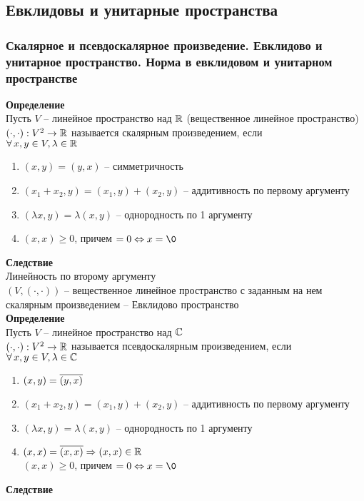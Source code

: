 \documentclass[12pt]{article}
\begin{document}
\subsection{Евклидовы и унитарные пространства}
\subsubsection{Скалярное и псевдоскалярное произведение. Евклидово и унитарное пространство. Норма в евклидовом и унитарном пространстве}
\textbf{Определение}\\
Пусть $V$ -- линейное пространство над $\mathbb{R}$ (вещественное линейное пространство)\\
$(\cdot,\cdot): V^2 \rightarrow \mathbb{R}$ называется скалярным произведением, если\\
$\forall\, x,y \in V, \lambda \in \mathbb{R}$
\begin{enumerate}
    \item $(x, y) = (y,x)$ -- симметричность
    \item $(x_1 + x_2, y) = (x_1, y) + (x_2, y)$ -- аддитивность по первому аргументу
    \item $(\lambda x, y) = \lambda(x,y)$ -- однородность по 1 аргументу
    \item $(x, x) \geq 0$, причем $=0 \LRto x=\0$
\end{enumerate}
\textbf{Следствие}\\
Линейность по второму аргументу\\
$(V, (\cdot, \cdot))$ -- вещественное линейное пространство с заданным на нем скалярным произведением -- Евклидово пространство\\
\textbf{Определение}\\
Пусть $V$ -- линейное пространство над $\mathbb{C}$\\
$(\cdot,\cdot): V^2 \rightarrow \mathbb{R}$ называется псевдоскалярным произведением, если\\
$\forall\, x,y \in V, \lambda \in \mathbb{C}$
\begin{enumerate}
    \item $(x, y) = \overline{(y,x)}$
    \item $(x_1 + x_2, y) = (x_1, y) + (x_2, y)$ -- аддитивность по первому аргументу
    \item $(\lambda x, y) = \lambda(x,y)$ -- однородность по 1 аргументу
    \item $(x,x) = \overline{(x, x)} \Rightarrow (x,x) \in \mathbb{R}$\\
    $(x, x) \geq 0$, причем $=0 \LRto x=\0$
\end{enumerate}
\textbf{Следствие}\\
\end{document}
